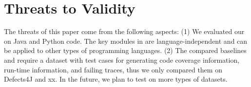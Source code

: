 \section{Threats to Validity}
The threats of this paper come from the following aspects: 
(1) We evaluated our {\tool} on Java and Python code. The key modules in {\tool} are language-independent and can be applied to other types of programming languages. 
(2) The compared baselines and {\tool} require a dataset with test cases for generating code coverage information, run-time information, and failing traces, thus we only compared them on Defects4J and xx. In the future, we plan to test {\tool} on more types of datasets. 

